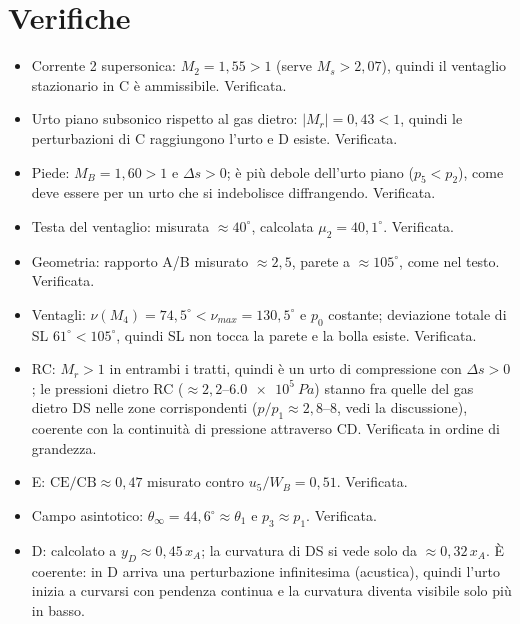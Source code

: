 \documentclass[11pt,a4paper]{article}
\begin{document}
\section{Verifiche}
\begin{itemize}
  \item Corrente 2 supersonica: $M_2=1{,}55>1$ (serve $M_s>2{,}07$), quindi il ventaglio stazionario in C è
  ammissibile. Verificata.
  \item Urto piano subsonico rispetto al gas dietro: $|M_r|=0{,}43<1$, quindi le perturbazioni di C raggiungono l'urto e
  D esiste. Verificata.
  \item Piede: $M_B=1{,}60>1$ e $\Delta s>0$; è più debole dell'urto piano ($p_5<p_2$), come deve essere per un urto che
  si indebolisce diffrangendo. Verificata.
  \item Testa del ventaglio: misurata $\approx40^\circ$, calcolata $\mu_2=40{,}1^\circ$. Verificata.
  \item Geometria: rapporto A/B misurato $\approx2{,}5$, parete a $\approx105^\circ$, come nel testo. Verificata.
  \item Ventagli: $\nu(M_4)=74{,}5^\circ<\nu_{max}=130{,}5^\circ$ e $p_0$ costante; deviazione totale di SL
  $61^\circ<105^\circ$, quindi SL non tocca la parete e la bolla esiste. Verificata.
  \item RC: $M_{r}>1$ in entrambi i tratti, quindi è un urto di compressione con $\Delta s>0$; le pressioni dietro RC
  ($\approx2{,}2$--$\SI{6.0e5}{Pa}$) stanno fra quelle del gas dietro DS nelle zone corrispondenti
  ($p/p_1\approx2{,}8$--$8$, vedi la discussione), coerente con la continuità di pressione attraverso CD.
  Verificata in ordine di grandezza.
  \item E: $\mathrm{CE}/\mathrm{CB}\approx0{,}47$ misurato contro $u_5/W_B=0{,}51$. Verificata.
  \item Campo asintotico: $\theta_\infty=44{,}6^\circ\approx\theta_1$ e $p_3\approx p_1$. Verificata.
  \item D: calcolato a $y_D\approx0{,}45\,x_A$; la curvatura di DS si vede solo da $\approx0{,}32\,x_A$. È coerente: in
  D arriva una perturbazione infinitesima (acustica), quindi l'urto inizia a curvarsi con pendenza continua e la
  curvatura diventa visibile solo più in basso.
\end{itemize}

\end{document}
